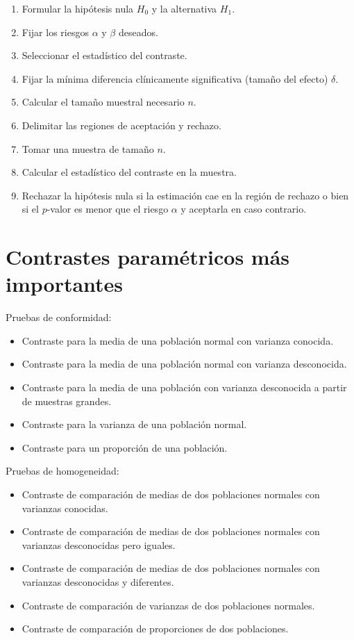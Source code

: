 \documentclass[
  spanish,
  a4paper,
]{scrreport}
\providecommand{\tightlist}{%
  \setlength{\itemsep}{0pt}\setlength{\parskip}{0pt}}
\theoremstyle{plain}
\theoremstyle{definition}
\theoremstyle{definition}
\theoremstyle{remark}
\begin{document}
\begin{enumerate}
\def\labelenumi{\arabic{enumi}.}
\tightlist
\item
  Formular la hipótesis nula \(H_0\) y la alternativa \(H_1\).
\item
  Fijar los riesgos \(\alpha\) y \(\beta\) deseados.
\item
  Seleccionar el estadístico del contraste.
\item
  Fijar la mínima diferencia clínicamente significativa (tamaño del
  efecto) \(\delta\).
\item
  Calcular el tamaño muestral necesario \(n\).
\item
  Delimitar las regiones de aceptación y rechazo.
\item
  Tomar una muestra de tamaño \(n\).
\item
  Calcular el estadístico del contraste en la muestra.
\item
  Rechazar la hipótesis nula si la estimación cae en la región de
  rechazo o bien si el \(p\)-valor es menor que el riesgo \(\alpha\) y
  aceptarla en caso contrario.
\end{enumerate}

\section{Contrastes paramétricos más
importantes}\label{contrastes-paramuxe9tricos-muxe1s-importantes}

Pruebas de conformidad:

\begin{itemize}
\tightlist
\item
  Contraste para la media de una población normal con varianza conocida.
\item
  Contraste para la media de una población normal con varianza
  desconocida.
\item
  Contraste para la media de una población con varianza desconocida a
  partir de muestras grandes.
\item
  Contraste para la varianza de una población normal.
\item
  Contraste para un proporción de una población.
\end{itemize}

Pruebas de homogeneidad:

\begin{itemize}
\tightlist
\item
  Contraste de comparación de medias de dos poblaciones normales con
  varianzas conocidas.
\item
  Contraste de comparación de medias de dos poblaciones normales con
  varianzas desconocidas pero iguales.
\item
  Contraste de comparación de medias de dos poblaciones normales con
  varianzas desconocidas y diferentes.
\item
  Contraste de comparación de varianzas de dos poblaciones normales.
\item
  Contraste de comparación de proporciones de dos poblaciones.
\end{itemize}
\end{document}
